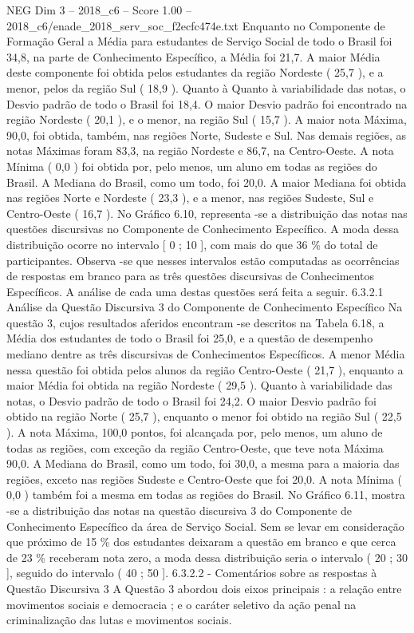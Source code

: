 \begin{textsample}{NEG Dim 3 – 2018\_c6 – Score 1.00 – 2018\_c6/enade\_2018\_serv\_soc\_f2ecfc474e.txt}
Enquanto no Componente de Formação Geral a Média para estudantes de Serviço Social de todo o Brasil foi 34,8, na parte de Conhecimento Específico, a Média foi 21,7.
A maior Média deste componente foi obtida pelos estudantes da região Nordeste ( 25,7 ), e a menor, pelos da região Sul ( 18,9 ).
Quanto à Quanto à variabilidade das notas, o Desvio padrão de todo o Brasil foi 18,4.
O maior Desvio padrão foi encontrado na região Nordeste ( 20,1 ), e o menor, na região Sul ( 15,7 ).
A maior nota Máxima, 90,0, foi obtida, também, nas regiões Norte, Sudeste e Sul.
Nas demais regiões, as notas Máximas foram 83,3, na região Nordeste e 86,7, na Centro-Oeste.
A nota Mínima ( 0,0 ) foi obtida por, pelo menos, um aluno em todas as regiões do Brasil.
A Mediana do Brasil, como um todo, foi 20,0.
A maior Mediana foi obtida nas regiões Norte e Nordeste ( 23,3 ), e a menor, nas regiões Sudeste, Sul e Centro-Oeste ( 16,7 ).
No Gráfico 6.10, representa -se a distribuição das notas nas questões discursivas no Componente de Conhecimento Específico.
A moda dessa distribuição ocorre no intervalo [ 0 ; 10 ], com mais do que 36 \% do total de participantes.
Observa -se que nesses intervalos estão computadas as ocorrências de respostas em branco para as três questões discursivas de Conhecimentos Específicos.
A análise de cada uma destas questões será feita a seguir. 6.3.2.1 Análise da Questão Discursiva 3 do Componente de Conhecimento Específico Na questão 3, cujos resultados aferidos encontram -se descritos na Tabela 6.18, a Média dos estudantes de todo o Brasil foi 25,0, e a questão de desempenho mediano dentre as três discursivas de Conhecimentos Específicos.
A menor Média nessa questão foi obtida pelos alunos da região Centro-Oeste ( 21,7 ), enquanto a maior Média foi obtida na região Nordeste ( 29,5 ).
Quanto à variabilidade das notas, o Desvio padrão de todo o Brasil foi 24,2.
O maior Desvio padrão foi obtido na região Norte ( 25,7 ), enquanto o menor foi obtido na região Sul ( 22,5 ).
A nota Máxima, 100,0 pontos, foi alcançada por, pelo menos, um aluno de todas as regiões, com exceção da região Centro-Oeste, que teve nota Máxima 90,0.
A Mediana do Brasil, como um todo, foi 30,0, a mesma para a maioria das regiões, exceto nas regiões Sudeste e Centro-Oeste que foi 20,0.
A nota Mínima ( 0,0 ) também foi a mesma em todas as regiões do Brasil.
No Gráfico 6.11, mostra -se a distribuição das notas na questão discursiva 3 do Componente de Conhecimento Específico da área de Serviço Social.
Sem se levar em consideração que próximo de 15 \% dos estudantes deixaram a questão em branco e que cerca de 23 \% receberam nota zero, a moda dessa distribuição seria o intervalo ( 20 ; 30 ], seguido do intervalo ( 40 ; 50 ]. 6.3.2.2 - Comentários sobre as respostas à Questão Discursiva 3 A Questão 3 abordou dois eixos principais : a relação entre movimentos sociais e democracia ; e o caráter seletivo da ação penal na criminalização das lutas e movimentos sociais.

\end{textsample}
